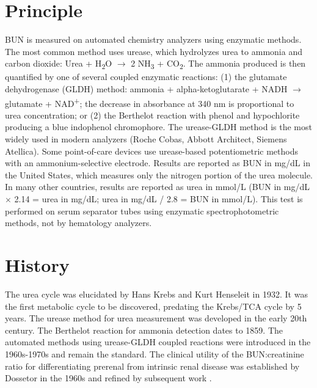 \section*{Principle}
BUN is measured on automated chemistry analyzers using enzymatic methods. The most common method uses urease, which hydrolyzes urea to ammonia and carbon dioxide: Urea + H\textsubscript{2}O $\rightarrow$ 2 NH\textsubscript{3} + CO\textsubscript{2}. The ammonia produced is then quantified by one of several coupled enzymatic reactions: (1) the glutamate dehydrogenase (GLDH) method: ammonia + alpha-ketoglutarate + NADH $\rightarrow$ glutamate + NAD\textsuperscript{+}; the decrease in absorbance at 340 nm is proportional to urea concentration; or (2) the Berthelot reaction with phenol and hypochlorite producing a blue indophenol chromophore. The urease-GLDH method is the most widely used in modern analyzers (Roche Cobas, Abbott Architect, Siemens Atellica). Some point-of-care devices use urease-based potentiometric methods with an ammonium-selective electrode. Results are reported as BUN in mg/dL in the United States, which measures only the nitrogen portion of the urea molecule. In many other countries, results are reported as urea in mmol/L (BUN in mg/dL $\times$ 2.14 = urea in mg/dL; urea in mg/dL / 2.8 = BUN in mmol/L). This test is performed on serum separator tubes using enzymatic spectrophotometric methods, not by hematology analyzers.

\section*{History}
The urea cycle was elucidated by Hans Krebs and Kurt Henseleit in 1932. It was the first metabolic cycle to be discovered, predating the Krebs/TCA cycle by 5 years. The urease method for urea measurement was developed in the early 20th century. The Berthelot reaction for ammonia detection dates to 1859. The automated methods using urease-GLDH coupled reactions were introduced in the 1960s-1970s and remain the standard. The clinical utility of the BUN:creatinine ratio for differentiating prerenal from intrinsic renal disease was established by Dossetor in the 1960s \cite{dossetor1966creatininemia} and refined by subsequent work \cite{morgan1977plasma}.

